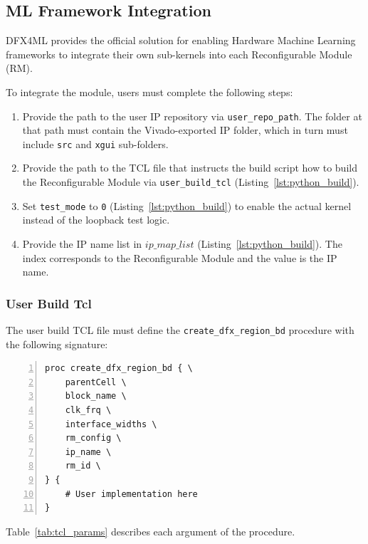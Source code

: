 \documentclass{cernatsnote}
\begin{document}
\subsection{ML Framework Integration}

DFX4ML provides the official solution for enabling Hardware Machine Learning frameworks to integrate their own sub-kernels into each Reconfigurable Module (RM).

To integrate the module, users must complete the following steps:
\begin{enumerate}
    \item Provide the path to the user IP repository via \texttt{user\_repo\_path}. The folder at that path must contain the Vivado-exported IP folder, which in turn must include \texttt{src} and \texttt{xgui} sub-folders.
    \item Provide the path to the TCL file that instructs the build script how to build the Reconfigurable Module via \texttt{user\_build\_tcl} (Listing~\ref{lst:python_build}).
    \item Set \texttt{test\_mode} to \texttt{0} (Listing~\ref{lst:python_build}) to enable the actual kernel instead of the loopback test logic.
    \item Provide the IP name list in $ip\_map\_list$ (Listing~\ref{lst:python_build}). The index corresponds to the Reconfigurable Module and the value is the IP name.
\end{enumerate}


\subsubsection{User Build Tcl}

The user build TCL file must define the \texttt{create\_dfx\_region\_bd} procedure with the following signature:

\begin{lstlisting}[style=tcl, caption={User Build TCL Procedure Signature}, label={lst:user_build_tcl}, numbers=left]
proc create_dfx_region_bd { \
    parentCell \
    block_name \
    clk_frq \
    interface_widths \
    rm_config \
    ip_name \
    rm_id \
} {
    # User implementation here
}
\end{lstlisting}

Table~\ref{tab:tcl_params} describes each argument of the procedure.
\end{document}
